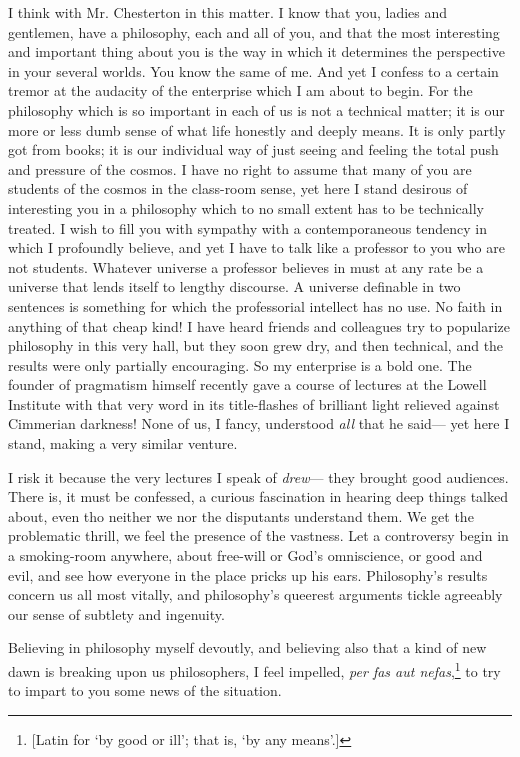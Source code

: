 \documentclass[]{article}
\begin{document}
I think with Mr. Chesterton in this matter. I know that you, ladies and
gentlemen, have a philosophy, each and all of you, and that the most
interesting and important thing about you is the way in which it
determines the perspective in your several worlds. You know the same
of me. And yet I confess to a certain tremor at the audacity of the
enterprise which I am about to begin. For the philosophy which is so
important in each of us is not a technical matter; it is our more or
less dumb sense of what life honestly and deeply means. It is only
partly got from books; it is our individual way of just seeing and
feeling the total push and pressure of the cosmos. I have no right to
assume that many of you are students of the cosmos in the class-room
sense, yet here I stand desirous of interesting you in a philosophy
which to no small extent has to be technically treated. I wish to fill
you with sympathy with a contemporaneous tendency in which I profoundly
believe, and yet I have to talk like a professor to you who are not
students. Whatever universe a professor believes in must at any rate be
a universe that lends itself to lengthy discourse. A universe definable
in two sentences is something for which the professorial intellect has
no use. No faith in anything of that cheap kind! I have heard friends
and colleagues try to popularize philosophy in this very hall, but they
soon grew dry, and then technical, and the results were only partially
encouraging. So my enterprise is a bold one. The founder of pragmatism
himself recently gave a course of lectures at the Lowell Institute with
that very word in its title-flashes of brilliant light relieved
against Cimmerian darkness! None of us, I fancy, understood \emph{all} that he
said--- yet here I stand, making a very similar venture.

I risk it because the very lectures I speak of \emph{drew}--- they brought good
audiences. There is, it must be confessed, a curious fascination in
hearing deep things talked about, even tho neither we nor the disputants
understand them. We get the problematic thrill, we feel the presence of
the vastness. Let a controversy begin in a smoking-room anywhere, about
free-will or God's omniscience, or good and evil, and see how everyone
in the place pricks up his ears. Philosophy's results concern us all
most vitally, and philosophy's queerest arguments tickle agreeably our
sense of subtlety and ingenuity.

Believing in philosophy myself devoutly, and believing also that a kind
of new dawn is breaking upon us philosophers, I feel impelled, \emph{per fas
aut nefas},\footnote{[Latin for `by good or ill'; that is, `by any means'.]} to try to impart to you some news of the situation.
\end{document}
